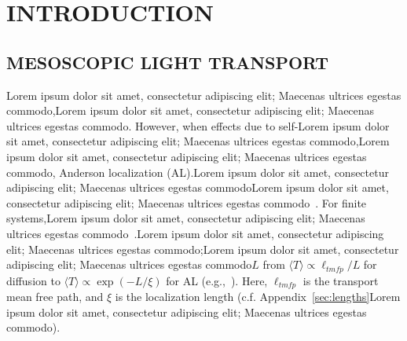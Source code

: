 \chapter{INTRODUCTION}
\label{chap:introduction}



\section{MESOSCOPIC LIGHT TRANSPORT}
\label{sec:what_field_am_i_in}
Lorem ipsum dolor sit amet, consectetur adipiscing elit; Maecenas ultrices egestas commodo,Lorem ipsum dolor sit amet, consectetur adipiscing elit; Maecenas ultrices egestas commodo\mbox{\cite{2009_Lagendijk_PT,1999_van_Rossum}}. However, when effects due to self-Lorem ipsum dolor sit amet, consectetur adipiscing elit; Maecenas ultrices egestas commodo,Lorem ipsum dolor sit amet, consectetur adipiscing elit; Maecenas ultrices egestas commodo, Anderson localization (AL)\cite{1958_Anderson}.Lorem ipsum dolor sit amet, consectetur adipiscing elit; Maecenas ultrices egestas commodoLorem ipsum dolor sit amet, consectetur adipiscing elit; Maecenas ultrices egestas commodo~\cite{1983_Frohlich,1988_Lifshits,1989_Dreifus}. For finite systems,Lorem ipsum dolor sit amet, consectetur adipiscing elit; Maecenas ultrices egestas commodo~\cite{1979_Anderson,1981_MacKinnon_scaling,2006_Markos}.Lorem ipsum dolor sit amet, consectetur adipiscing elit; Maecenas ultrices egestas commodo;Lorem ipsum dolor sit amet, consectetur adipiscing elit; Maecenas ultrices egestas commodo$L$ from $\langle T \rangle \propto \ell_{tmfp}/L$ for diffusion to $\langle T \rangle \propto \exp(-L/\xi)$ for AL (e.g.,~\cite{1999_van_Tiggelen}). Here, $\ell_{tmfp}$ is the transport mean free path, and $\xi$ is the localization length (c.f. Appendix~\ref{sec:lengths}Lorem ipsum dolor sit amet, consectetur adipiscing elit; Maecenas ultrices egestas commodo). 

